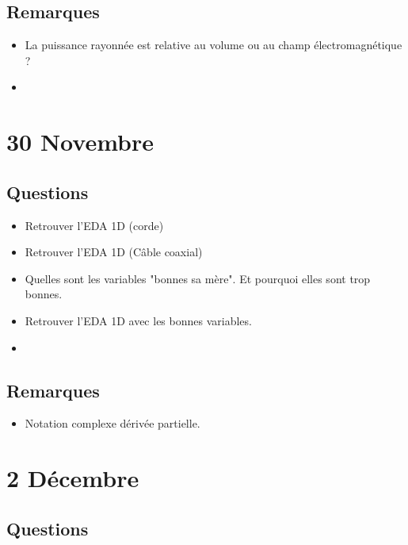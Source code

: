 \documentclass[a4paper, 11pt, hidelinks]{article}
\begin{document}
\subsection{Remarques}

\begin{itemize}
    \item La puissance rayonnée est relative au volume ou au champ électromagnétique ?
    \item 
\end{itemize}



\section{30 Novembre}

\subsection{Questions}

\begin{itemize}
    \item Retrouver l'EDA 1D (corde) \cite{Chapitre15}
    \item Retrouver l'EDA 1D (Câble coaxial) \cite{Chapitre15}
    \item Quelles sont les variables "bonnes sa mère". Et pourquoi elles sont trop bonnes. \cite{Chapitre15}
    \item Retrouver l'EDA 1D avec les bonnes variables. \cite{Chapitre15}
    \item 
\end{itemize}




\subsection{Remarques}


\begin{itemize}
    \item Notation complexe dérivée partielle.
\end{itemize}





\section{2 Décembre}


\subsection{Questions}
\end{document}
